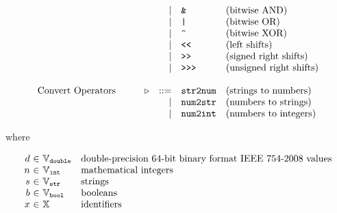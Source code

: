 \[\begin{array}{lrclrll}
    &&&&\mid& \C{\&}                                            & \text{(bitwise AND)}\\
    &&&&\mid& \C{|}                                             & \text{(bitwise OR)}\\
    &&&&\mid& \C{\char`^}                                       & \text{(bitwise XOR)}\\
    &&&&\mid& \C{<}\C{<}                                        & \text{(left shifts)}\\
    &&&&\mid& \C{>}\C{>}                                        & \text{(signed right shifts)}\\
    &&&&\mid& \C{>}\C{>}\C{>}                                   & \text{(unsigned right shifts)}\\
    \\
    \text{Convert Operators} &&& \cop &
    ::= & \C{str2num}                                           & \text{(strings to numbers)}\\
    &&&&\mid& \C{num2str}                                       & \text{(numbers to strings)}\\
    &&&&\mid& \C{num2int}                                       & \text{(numbers to integers)}\\
  \end{array}
\]

where

\[
  \begin{array}{r@{~}c@{~}ll}
    \double   &\in& \doubleset  & \text{double-precision 64-bit binary format
                                        IEEE 754-2008 values}\\
    \intvalue &\in& \intset     & \text{mathematical integers}\\
    \str      &\in& \strset     & \text{strings}\\
    \bool     &\in& \boolset    & \text{booleans}\\
    \id       &\in& \idset      & \text{identifiers}\\
  \end{array}
\]

\newpage
